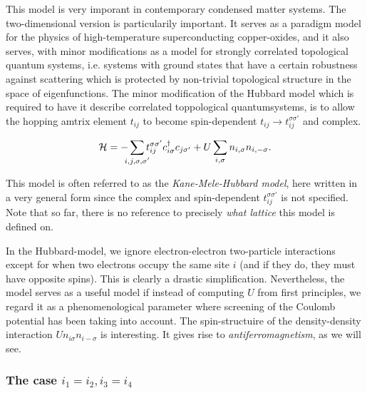 This model is very imporant in contemporary condensed matter systems. 
The two-dimensional version is particularily important. It serves as a paradigm model for the physics of high-temperature superconducting copper-oxides, and it also serves, with minor modifications as a model for strongly correlated topological quantum systems, i.e. systems with ground states that have a certain robustness against scattering which is protected by non-trivial topological structure in the space of eigenfunctions. 
The minor modification of the Hubbard model which is required to have it describe correlated toppological quantumsystems, is to allow the hopping amtrix element $t_{ij}$ to become spin-dependent $t_{ij}\rightarrow t_{ij}^{\sigma\sigma'}$ and complex.
\begin{tcolorbox}
	\begin{equation}
		\Ha = -\sum_{\mathclap{i,j,\sigma,\sigma'}}t_{ij}^{\sigma\sigma'}\cd_{i\sigma}c_{j\sigma'} + U\sum_{i,\sigma}n_{i,\sigma}n_{i,-\sigma}.
	\end{equation}
\end{tcolorbox}
This model is often referred to as the \emph{Kane-Mele-Hubbard model}, here written in a very general form since the complex and spin-dependent $t_{ij}^{\sigma\sigma'}$ is not specified.
Note that so far, there is no reference to precisely \emph{what lattice} this model is defined on.

In the Hubbard-model, we ignore electron-electron two-particle interactions except for when two electrons occupy the same site $ i $ (and if they do, they must have opposite spins). This is clearly a drastic simplification. Nevertheless, the model serves as a useful model if instead of computing $U$ from first principles, we regard it as a phenomenological parameter where screening of the Coulomb potential has been taking into account.
The spin-structuire of the density-density interaction $Un_{i\sigma}n_{i-\sigma}$ is interesting. It gives rise to \emph{antiferromagnetism}, as we will see.

\subsubsection*{The case $i_1=i_2, i_3 = i_4$}

